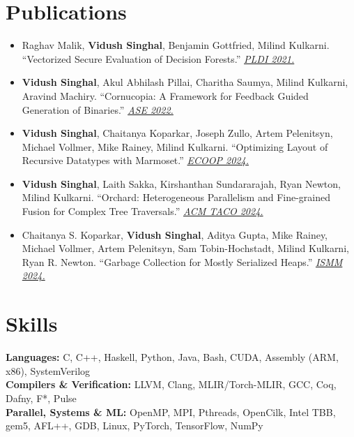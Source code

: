 \documentclass[10pt,letterpaper]{article}
\begin{document}
\section*{Publications}
\begin{itemize}[leftmargin=1em]
  \item Raghav Malik, \textbf{Vidush Singhal}, Benjamin Gottfried, Milind Kulkarni. “Vectorized Secure Evaluation of Decision Forests.” \href{https://dl.acm.org/doi/abs/10.1145/3453483.3454094}{\textcolor{ultramarineblue}{\textit{PLDI 2021.}}}
  \item \textbf{Vidush Singhal}, Akul Abhilash Pillai, Charitha Saumya, Milind Kulkarni, Aravind Machiry. “Cornucopia: A Framework for Feedback Guided Generation of Binaries.” \href{https://dl.acm.org/doi/abs/10.1145/3551349.3561152}{\textcolor{ultramarineblue}{\textit{ASE 2022.}}}
  \item \textbf{Vidush Singhal}, Chaitanya Koparkar, Joseph Zullo, Artem Pelenitsyn, Michael Vollmer, Mike Rainey, Milind Kulkarni. “Optimizing Layout of Recursive Datatypes with Marmoset.” \href{https://drops.dagstuhl.de/entities/document/10.4230/LIPIcs.ECOOP.2024.38}{\textcolor{ultramarineblue}{\textit{ECOOP 2024.}}}
  \item \textbf{Vidush Singhal}, Laith Sakka, Kirshanthan Sundararajah, Ryan Newton, Milind Kulkarni. “Orchard: Heterogeneous Parallelism and Fine-grained Fusion for Complex Tree Traversals.” \href{https://dl.acm.org/doi/full/10.1145/3652605}{\textcolor{ultramarineblue}{\textit{ACM TACO 2024.}}}
  \item Chaitanya S. Koparkar, \textbf{Vidush Singhal}, Aditya Gupta, Mike Rainey, Michael Vollmer, Artem Pelenitsyn, Sam Tobin-Hochstadt, Milind Kulkarni, Ryan R. Newton. “Garbage Collection for Mostly Serialized Heaps.” \href{https://dl.acm.org/doi/abs/10.1145/3652024.3665512}{\textcolor{ultramarineblue}{\textit{ISMM 2024.}}}
\end{itemize}
\section*{Skills}
\textbf{Languages:} C, C++, Haskell, Python, Java, Bash, CUDA, Assembly (ARM, x86), SystemVerilog\\
\textbf{Compilers \& Verification:} LLVM, Clang, MLIR/Torch-MLIR, GCC, Coq, Dafny, F*, Pulse\\
\textbf{Parallel, Systems \& ML:} OpenMP, MPI, Pthreads, OpenCilk, Intel TBB, gem5, AFL++, GDB, Linux, PyTorch, TensorFlow, NumPy
\end{document}
